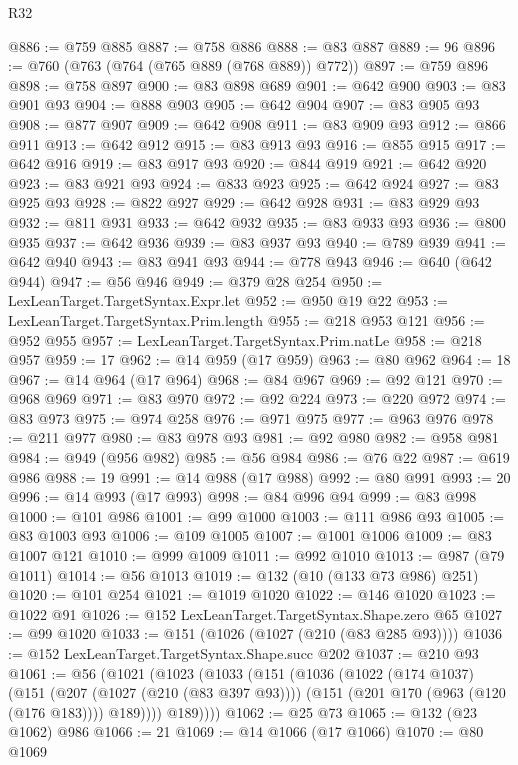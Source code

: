 \begin{lexlean}{R32}
\begin{coremodule}
@886 := @759 @885
@887 := @758 @886
@888 := @83 @887
@889 := 96
@896 := @760 (@763 (@764 (@765 @889 (@768 @889)) @772))
@897 := @759 @896
@898 := @758 @897
@900 := @83 @898 @689
@901 := @642 @900
@903 := @83 @901 @93
@904 := @888 @903
@905 := @642 @904
@907 := @83 @905 @93
@908 := @877 @907
@909 := @642 @908
@911 := @83 @909 @93
@912 := @866 @911
@913 := @642 @912
@915 := @83 @913 @93
@916 := @855 @915
@917 := @642 @916
@919 := @83 @917 @93
@920 := @844 @919
@921 := @642 @920
@923 := @83 @921 @93
@924 := @833 @923
@925 := @642 @924
@927 := @83 @925 @93
@928 := @822 @927
@929 := @642 @928
@931 := @83 @929 @93
@932 := @811 @931
@933 := @642 @932
@935 := @83 @933 @93
@936 := @800 @935
@937 := @642 @936
@939 := @83 @937 @93
@940 := @789 @939
@941 := @642 @940
@943 := @83 @941 @93
@944 := @778 @943
@946 := @640 (@642 @944)
@947 := @56 @946
@949 := @379 @28 @254
@950 := LexLeanTarget.TargetSyntax.Expr.let
@952 := @950 @19 @22
@953 := LexLeanTarget.TargetSyntax.Prim.length
@955 := @218 @953 @121
@956 := @952 @955
@957 := LexLeanTarget.TargetSyntax.Prim.natLe
@958 := @218 @957
@959 := 17
@962 := @14 @959 (@17 @959)
@963 := @80 @962
@964 := 18
@967 := @14 @964 (@17 @964)
@968 := @84 @967
@969 := @92 @121
@970 := @968 @969
@971 := @83 @970
@972 := @92 @224
@973 := @220 @972
@974 := @83 @973
@975 := @974 @258
@976 := @971 @975
@977 := @963 @976
@978 := @211 @977
@980 := @83 @978 @93
@981 := @92 @980
@982 := @958 @981
@984 := @949 (@956 @982)
@985 := @56 @984
@986 := @76 @22
@987 := @619 @986
@988 := 19
@991 := @14 @988 (@17 @988)
@992 := @80 @991
@993 := 20
@996 := @14 @993 (@17 @993)
@998 := @84 @996 @94
@999 := @83 @998
@1000 := @101 @986
@1001 := @99 @1000
@1003 := @111 @986 @93
@1005 := @83 @1003 @93
@1006 := @109 @1005
@1007 := @1001 @1006
@1009 := @83 @1007 @121
@1010 := @999 @1009
@1011 := @992 @1010
@1013 := @987 (@79 @1011)
@1014 := @56 @1013
@1019 := @132 (@10 (@133 @73 @986) @251)
@1020 := @101 @254
@1021 := @1019 @1020
@1022 := @146 @1020
@1023 := @1022 @91
@1026 := @152 LexLeanTarget.TargetSyntax.Shape.zero @65
@1027 := @99 @1020
@1033 := @151 (@1026 (@1027 (@210 (@83 @285 @93))))
@1036 := @152 LexLeanTarget.TargetSyntax.Shape.succ @202
@1037 := @210 @93
@1061 := @56
    (@1021
      (@1023
        (@1033
          (@151
            (@1036
              (@1022
                (@174 @1037)
                (@151
                  (@207 (@1027 (@210 (@83 @397 @93))))
                  (@151 (@201 @170 (@963 (@120 (@176 @183)))) @189))))
            @189))))
@1062 := @25 @73
@1065 := @132 (@23 @1062) @986
@1066 := 21
@1069 := @14 @1066 (@17 @1066)
@1070 := @80 @1069

\end{coremodule}
\end{lexlean}
